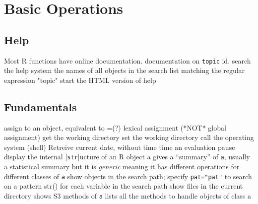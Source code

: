 
\def\content{\uppercase{r}}
\def\shortcontent{\content}
\def\versionnumber{1.2}  %
\def\version{v\versionnumber\ \month\ \year}


\mytitle

\shortintro
\shortintroR


\section{Basic Operations}{}
\subsection{Help}{Most R functions have online documentation.}
	{documentation on {\tt topic}}
	{id.}
	{search the help system}
	{the names of all objects in the search list
    matching the regular ex\-pres\-sion "to\-pic"}
	{start the HTML version of help}

\subsection{Fundamentals}{}
\cmdS{<-}	{assign to an object, equivalent to =(?)}
\cmdS{<<-}	{lexical assignment (*NOT* global assignment)}
	{get the working directory}
	{set the working directory}
	{call the operating system (shell)}
	{Retreive current date, without time}
	{time an evaluation}
	{pause}
	{display the internal [{\tt str}]ucture of an R object a}
	{gives a ``summary'' of {\tt a}, usually a statistical summary but it is {\it generic} meaning it has different operations for different classes of {\tt a}}
	{show objects in the search path; specify {\tt pat="pat"} to search on a pattern}
	{str() for each variable in the search path}
	{show files in the current directory}
	{shows S3 methods of {\tt a}}
	{lists all the methods to handle objects of class a}

